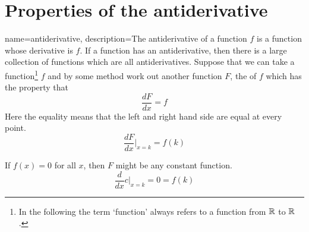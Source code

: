 \chapter{Properties of the antiderivative}

{
	name=antiderivative,
	description={The antiderivative of a function $f$ is a function whose derivative is $f$. If a function has an antiderivative, then there is a large collection of functions which are all antiderivatives.}
}
Suppose that we can take a function\footnote{In the following the term `function' always refers to a function from $\mathbb{R}$ to $\mathbb{R}$.} $f$ and by some method work out another function $F$, the  of $f$ which has the property that
\[ \frac{dF}{dx} = f \]
Here the equality means that the left and right hand side are equal at every point.
\[ \frac{dF}{dx} |_{x=k} = f(k) \]

If $f(x) = 0$ for all $x$, then $F$ might be any constant function. 
\[ \frac{d}{dx}c |_{x=k} = 0 = f(k) \]


